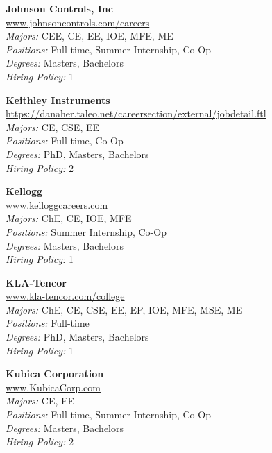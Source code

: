 \documentclass[twoside]{article}
\begin{document}
\begin{center}
\begin{multicols}{3}
\begin{minipage}{.9\columnwidth}{\Large\bf Johnson Controls, Inc }\\
	\url{www.johnsoncontrols.com/careers}\\
	\emph{Majors:} CEE, CE, EE, IOE, MFE, ME\\
	\emph{Positions:} Full-time, Summer Internship, Co-Op\\
	\emph{Degrees:} Masters, Bachelors\\
	\emph{Hiring Policy:} 1\\
\end{minipage}
 
\begin{minipage}{.9\columnwidth}{\Large\bf Keithley Instruments }\\
	\url{https://danaher.taleo.net/careersection/external/jobdetail.ftl}\\
	\emph{Majors:} CE, CSE, EE\\
	\emph{Positions:} Full-time, Co-Op\\
	\emph{Degrees:} PhD, Masters, Bachelors\\
	\emph{Hiring Policy:} 2\\
\end{minipage}
 
\begin{minipage}{.9\columnwidth}{\Large\bf Kellogg }\\
	\url{www.kelloggcareers.com}\\
	\emph{Majors:} ChE, CE, IOE, MFE\\
	\emph{Positions:} Summer Internship, Co-Op\\
	\emph{Degrees:} Masters, Bachelors\\
	\emph{Hiring Policy:} 1\\
\end{minipage}
 
\begin{minipage}{.9\columnwidth}{\Large\bf KLA-Tencor }\\
	\url{www.kla-tencor.com/college}\\
	\emph{Majors:} ChE, CE, CSE, EE, EP, IOE, MFE, MSE, ME\\
	\emph{Positions:} Full-time\\
	\emph{Degrees:} PhD, Masters, Bachelors\\
	\emph{Hiring Policy:} 1\\
\end{minipage}
 
\begin{minipage}{.9\columnwidth}{\Large\bf Kubica Corporation }\\
	\url{www.KubicaCorp.com}\\
	\emph{Majors:} CE, EE\\
	\emph{Positions:} Full-time, Summer Internship, Co-Op\\
	\emph{Degrees:} Masters, Bachelors\\
	\emph{Hiring Policy:} 2\\
\end{minipage}
 

\end{multicols}
\end{center}
\end{document}
